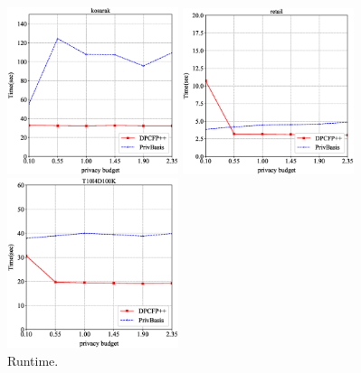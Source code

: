 \documentclass[conference]{IEEEtran}
\begin{document}
\begin{figure}[htbp]
    \begin{minipage}[t]{0.3\textwidth}
    \centering
    \includegraphics[width=5cm]{Runtime_kosarak.eps}
    \end{minipage}
    \hfill
    \begin{minipage}[t]{0.3\textwidth}
    \centering
    \includegraphics[width=5cm]{Runtime_retail.eps}
    \end{minipage}
    \hfill
    \begin{minipage}[t]{0.3\textwidth}
    \centering
    \includegraphics[width=5cm]{Runtime_T10I4D100K.eps}
    \end{minipage}
\caption{Runtime.}
\label{fig3}
\end{figure}


\end{document}
